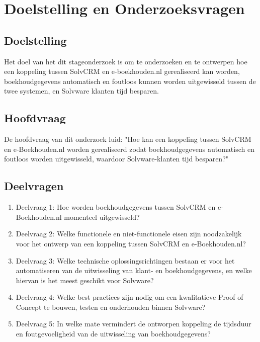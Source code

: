 \chapter{Doelstelling en Onderzoeksvragen}

\section{Doelstelling}

Het doel van het dit stageonderzoek is om te onderzoeken en te ontwerpen hoe een koppeling tussen SolvCRM en e-boekhouden.nl gerealiseerd kan worden, boekhoudgegevens automatisch en foutloos kunnen worden uitgewisseld tussen de twee systemen, en Solvware klanten tijd besparen.

\section{Hoofdvraag}

De hoofdvraag van dit onderzoek luid:
"Hoe kan een koppeling tussen SolvCRM en e-Boekhouden.nl worden gerealiseerd
zodat boekhoudgegevens automatisch en foutloos worden uitgewisseld,
waardoor Solvware-klanten tijd besparen?"

\section{Deelvragen}
\begin{enumerate}
    \item Deelvraag 1: Hoe worden boekhoudgegevens tussen SolvCRM en e-Boekhouden.nl momenteel uitgewisseld?
    \item Deelvraag 2: Welke functionele en niet-functionele eisen zijn noodzakelijk voor het ontwerp van een koppeling tussen SolvCRM en e-Boekhouden.nl?
    \item Deelvraag 3: Welke technische oplossingsrichtingen bestaan er voor het automatiseren van de uitwisseling van klant- en boekhoudgegevens, en welke hiervan is het meest geschikt voor Solvware?
    \item Deelvraag 4: Welke best practices zijn nodig om een kwalitatieve Proof of Concept te bouwen, testen en onderhouden binnen Solvware?
    \item Deelvraag 5: In welke mate vermindert de ontworpen koppeling de tijdsduur en foutgevoeligheid van de uitwisseling van boekhoudgegevens?

\end{enumerate}
